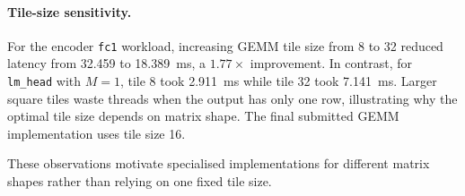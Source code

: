 \paragraph{Tile-size sensitivity.}
For the encoder \texttt{fc1} workload, increasing
GEMM tile size from 8 to 32 reduced latency
from 32.459 to 18.389~ms, a $1.77\times$
improvement. In contrast, for \texttt{lm\_head}
with $M=1$, tile 8 took 2.911~ms while tile 32
took 7.141~ms. Larger square tiles waste
threads when the output has only one row,
illustrating why the optimal tile size depends
on matrix shape. The final submitted GEMM
implementation uses tile size 16.

These observations motivate specialised
implementations for different matrix shapes
rather than relying on one fixed tile size.

